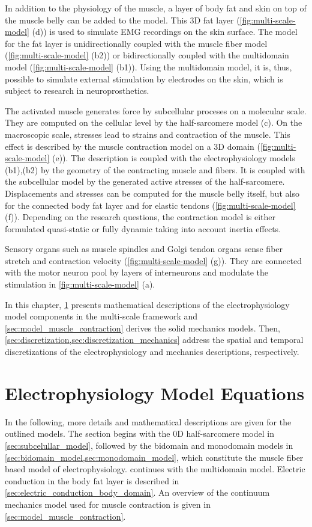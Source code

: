 In addition to the physiology of the muscle, a layer of body fat and skin on top of the muscle belly can be added to the model. This 3D fat layer (\cref{fig:multi-scale-model} (d)) is used to simulate EMG recordings on the skin surface. The model for the fat layer is unidirectionally coupled with the muscle fiber model (\cref{fig:multi-scale-model} (b2)) or bidirectionally coupled with the multidomain model (\cref{fig:multi-scale-model} (b1)). Using the multidomain model, it is, thus, possible to simulate external stimulation by electrodes on the skin, which is subject to research in neuroprosthetics.

The activated muscle generates force by subcellular proceses on a molecular scale. They are computed on the cellular level by the half-sarcomere model (c). On the macroscopic scale, stresses lead to strains and contraction of the muscle. This effect is described by the muscle contraction model on a 3D domain (\cref{fig:multi-scale-model} (e)). 
The description is coupled with the electrophysiology models (b1),(b2) by the geometry of the contracting muscle and fibers. It is coupled with the subcellular model by the generated active stresses of the half-sarcomere. Displacements and stresses can be computed for the muscle belly itself, but also for the connected body fat layer and for elastic tendons (\cref{fig:multi-scale-model} (f)). Depending on the research questions, the contraction model is either formulated quasi-static or fully dynamic taking into account inertia effects.

Sensory organs such as muscle spindles and Golgi tendon organs sense fiber stretch and contraction velocity (\cref{fig:multi-scale-model} (g)). They are connected with the motor neuron pool by layers of interneurons and modulate the stimulation in \cref{fig:multi-scale-model} (a).

In this chapter, \cref{sec:model_equations} presents mathematical descriptions of the electrophysiology model components in the multi-scale framework and \cref{sec:model_muscle_contraction} derives the solid mechanics models. Then, \cref{sec:discretization,sec:discretization_mechanics} address the spatial and temporal discretizations of the electrophysiology and mechanics descriptions, respectively.

\section{Electrophysiology Model Equations}\label{sec:model_equations}
In the following, more details and mathematical descriptions are given for the outlined models. The section begins with the 0D half-sarcomere model in \cref{sec:subcelullar_model}, followed by the bidomain and monodomain models in \cref{sec:bidomain_model,sec:monodomain_model}, which constitute the muscle fiber based model of electrophysiology.  continues with the multidomain model. Electric conduction in the body fat layer is described in \cref{sec:electric_conduction_body_domain}. An overview of the continuum mechanics model used for muscle contraction is given in \cref{sec:model_muscle_contraction}.
